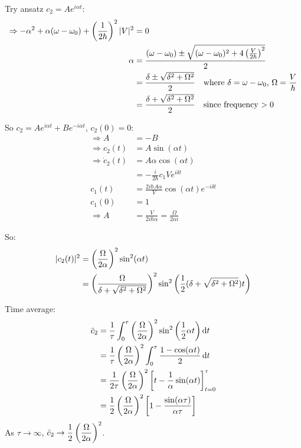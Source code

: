 \begin{parts}
	Try ansatz $c_2 = A e^{i\alpha t}$:
	\begin{align*}
		\Rightarrow -\alpha^2 + \alpha (\omega - \omega_0) + \left(\frac{1}{2\hbar}\right)^2 |V|^2 &= 0 \\
		\alpha &= \frac{(\omega - \omega_0) \pm \sqrt{(\omega - \omega_0)^2 + 4 \left(\frac{V}{2\hbar}\right)^2}}{2} \\
		&= \frac{\delta \pm \sqrt{\delta^2 + \Omega^2}}{2} \textnormal{\hspace{1em}where $\delta = \omega - \omega_0$, $\Omega = \dfrac{V}{\hbar}$} \\
		&= \frac{\delta + \sqrt{\delta^2 + \Omega^2}}{2} \textnormal{\hspace{1em}since frequency $>0$}
	\end{align*}
	
	So $c_2 = A e^{i\alpha t} + B e^{-i\alpha t}$, $c_2(0)=0$:
	\begin{align*}
		\Rightarrow A &= -B \\
		\Rightarrow c_2(t) &= A \sin (\alpha t) \\
		\Rightarrow \dot{c}_2(t) &= A\alpha \cos (\alpha t) \\
		&= -\frac{i}{2\hbar} c_1 V e^{i\delta t} \\[1em]
		c_1(t) &= \frac{2i\hbar A\alpha}{V} \cos (\alpha t) e^{-i\delta t} \\
		c_1(0) &= 1 \\
		\Rightarrow A &= \frac{V}{2i\hbar\alpha} = \frac{\Omega}{2\alpha i}
	\end{align*}
	
	So:
	\begin{align*}
		|c_2(t)|^2 &= \left(\frac{\Omega}{2\alpha}\right)^2 \sin^2 (\alpha t) \\
		&= \left(\frac{\Omega}{\delta + \sqrt{\delta^2 + \Omega^2}}\right)^2 \sin^2 \left(\frac{1}{2} (\delta + \sqrt{\delta^2 + \Omega^2}) t\right)
	\end{align*}
	
	Time average:
	\begin{align*}
		\bar{c}_2 &= \frac{1}{\tau} \int_{0}^{\tau} {\left(\frac{\Omega}{2\alpha}\right)^2 \sin^2 \left(\frac{1}{2}\alpha t\right)} \,\mathrm{d}{t} \\
		&= \frac{1}{\tau} \left(\frac{\Omega}{2\alpha}\right)^2 \int_{0}^{\tau} {\frac{1-\cos (\alpha t)}{2}} \,\mathrm{d}{t} \\
		&= \frac{1}{2\tau} \left(\frac{\Omega}{2\alpha}\right)^2 \left[t - \frac{1}{\alpha} \sin (\alpha t)\right]_{t=0}^\tau \\
		&= \frac{1}{2} \left(\frac{\Omega}{2\alpha}\right)^2 \left[1-\frac{\sin (\alpha\tau)}{\alpha\tau}\right]
	\end{align*}
	As $\tau\to\infty$, $\bar{c}_2 \to \dfrac{1}{2} \left(\dfrac{\Omega}{2\alpha}\right)^2$.
	

\end{parts}
